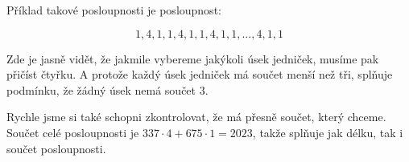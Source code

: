 \documentclass{fkssolpub}
\author{Ondřej Sedláček}
\begin{document}
 

Příklad takové posloupnosti je posloupnost:

\[
  1, 4, 1, 1, 4, 1, 1, 4, 1, 1, ..., 4, 1, 1
\]

Zde je jasně vidět, že jakmile vybereme jakýkoli úsek jedniček, musíme
pak přičíst čtyřku. A protože každý úsek jedniček má součet menší než tři,
splňuje podmínku, že žádný úsek nemá součet 3.

Rychle jsme si také schopni zkontrolovat, že má přesně součet, který chceme.
Součet celé posloupnosti je $337 \cdot 4 + 675 \cdot 1 = 2023$, takže splňuje
jak délku, tak i součet posloupnosti.
\end{document}
